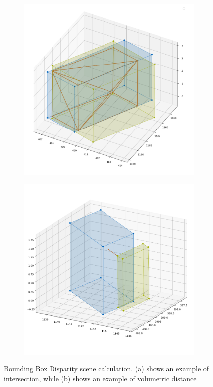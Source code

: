 \begin{figure}[!ht]
    \centering
    \begin{subfigure}[b]{0.45\textwidth}
        \includegraphics[width=\textwidth]{images/methodology/frame_0_3d_bb.png}
        \caption{}
        \label{fig:bbox_disparity_a}
    \end{subfigure}
    \begin{subfigure}[b]{0.45\textwidth}
        \includegraphics[width=\textwidth]{images/methodology/frame_2_3d_bb.png}
        \caption{}
        \label{fig:bbox_disparity_b}
    \end{subfigure}
    \caption{Bounding Box Disparity scene calculation. (a) shows an example of intersection, while (b) shows an example of volumetric distance}
    \label{fig:bbox_disparity}
\end{figure}

